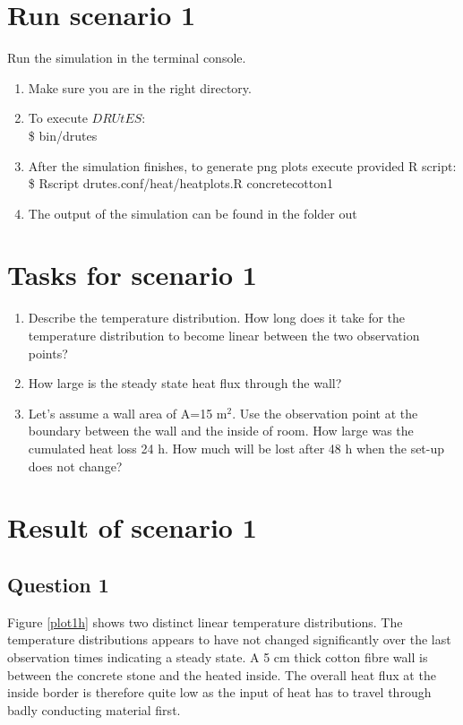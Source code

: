 \section*{Run scenario 1}
Run the simulation in the terminal console.
\begin{enumerate}
\item Make sure you are in the right directory. 
\item To execute $DRUtES$: \\
\$ bin/drutes
\item After the simulation finishes, to generate png plots execute provided R script: \\
\$ Rscript drutes.conf/heat/heatplots.R concretecotton1
\item The output of the simulation can be found in the folder out

\end{enumerate}

\section*{Tasks for scenario 1}

\begin{enumerate}
\item Describe the temperature distribution. How long does it take for the temperature distribution to become linear between the two observation points?
\item How large is the steady state heat flux through the wall?
\item Let's assume a wall area of A=15 m$^2$. Use the observation point at the boundary between the wall and the inside of room. How large was the cumulated heat loss 24 h. How much will be lost after 48 h when the set-up does not change?
\end{enumerate}


\section*{Result of scenario 1}

\subsection*{Question 1}
Figure \ref{plot1h} shows two distinct linear temperature distributions. The temperature distributions appears to have not changed significantly over the last observation times indicating a steady state. A 5 cm thick cotton fibre wall is between the concrete stone and the heated inside. The overall heat flux at the inside border is therefore quite low as the input of heat has to travel through badly conducting material first. 

